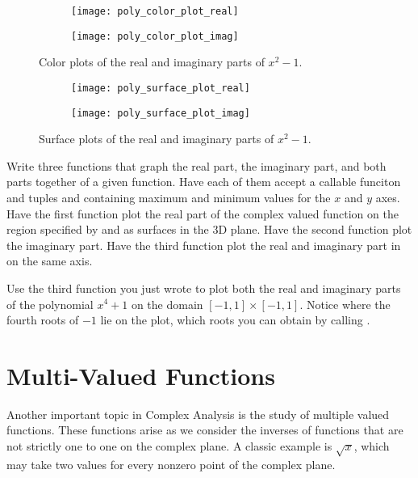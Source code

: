 \begin{figure}
\begin{subfigure}{.49\textwidth}
\texttt{[image: poly\_color\_plot\_real]}
\end{subfigure}
\begin{subfigure}{.49\textwidth}
\texttt{[image: poly\_color\_plot\_imag]}
\end{subfigure}
\caption{Color plots of the real and imaginary parts of $x^2 - 1$.}
\label{fig:poly_color_plot}
\end{figure}

\begin{figure}
\begin{subfigure}{.49\textwidth}
\texttt{[image: poly\_surface\_plot\_real]}
\end{subfigure}
\begin{subfigure}{.49\textwidth}
\texttt{[image: poly\_surface\_plot\_imag]}
\end{subfigure}
\caption{Surface plots of the real and imaginary parts of $x^2 - 1$.}
\label{fig:poly_surface_plot}
\end{figure}

\begin{problem}
Write three functions that graph the real part, the imaginary part, and both parts together of a given function.
Have each of them accept a callable funciton  and tuples  and  containing maximum and minimum values for the $x$ and $y$ axes.
Have the first function plot the real part of the complex valued function  on the region specified by  and  as surfaces in the 3D plane.
Have the second function plot the imaginary part.
Have the third function plot the real and imaginary part in on the same axis.

Use the third function you just wrote to plot both the real and imaginary parts of the polynomial $x^4 + 1$ on the domain $\left[-1, 1\right] \times \left[-1, 1\right]$.
Notice where the fourth roots of $-1$ lie on the plot, which roots you can obtain by calling .
\end{problem}

\section*{Multi-Valued Functions}

Another important topic in Complex Analysis is the study of multiple valued functions.
These functions arise as we consider the inverses of functions that are not strictly one to one on the complex plane.
A classic example is $\sqrt{x}$, which may take two values for every nonzero point of the complex plane.

